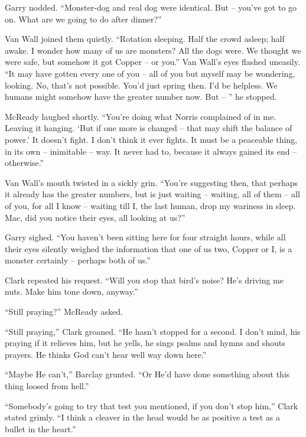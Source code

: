\documentclass[ebook,oneside,11pt]{memoir}				%
\begin{document}
Garry nodded. ``Monster-dog and real dog were identical. But -- you've got to go on. What are we going to do after dinner?''

Van Wall joined them quietly. ``Rotation sleeping. Half the crowd asleep; half awake. I wonder how many of us are monsters? All the dogs were. We thought we were safe, but somehow it got Copper -- or you.'' Van Wall's eyes flashed uneasily. ``It may have gotten every one of you -- all of you but myself may be wondering, looking. No, that's not possible. You'd just spring then. I'd be helpless. We humans might somehow have the greater number now. But -- '' he stopped.

McReady laughed shortly. ``You're doing what Norris complained of in me. Leaving it hanging. `But if one more is changed -- that may shift the balance of power.' It doesn't fight. I don't think it ever fights. It must be a peaceable thing, in its own -- inimitable -- way. It never had to, because it always gained its end -- otherwise.''

Van Wall's mouth twisted in a sickly grin. ``You're suggesting then, that perhaps it already has the greater numbers, but is just waiting -- waiting, all of them -- all of you, for all I know -- waiting till I, the last human, drop my wariness in sleep. Mac, did you notice their eyes, all looking at us?''

Garry sighed. ``You haven't been sitting here for four straight hours, while all their eyes silently weighed the information that one of us two, Copper or I, is a monster certainly -- perhaps both of us.''

Clark repeated his request. ``Will you stop that bird's noise? He's driving me nuts. Make him tone down, anyway.''

``Still praying?'' McReady asked.

``Still praying,'' Clark groaned. ``He hasn't stopped for a second. I don't mind, his praying if it relieves him, but he yells, he sings psalms and hymns and shouts prayers. He thinks God can't hear well way down here.''

``Maybe He can't,'' Barclay grunted. ``Or He'd have done something about this thing loosed from hell.''

``Somebody's going to try that test you mentioned, if you don't stop him,'' Clark stated grimly. ``I think a cleaver in the head would be as positive a test as a bullet in the heart.''
\end{document}
